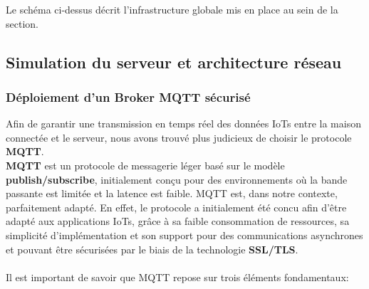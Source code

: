 \documentclass[10pt, a4paper]{report}
\begin{document}
	Le schéma ci-dessus décrit l'infrastructure globale mis en place au sein de la section.
	
	
 
	\subsection{Simulation du serveur et architecture réseau}
	\subsubsection{Déploiement d'un Broker MQTT sécurisé}
	
	Afin de garantir une transmission en temps réel des données IoTs entre la maison connectée et le serveur, nous avons trouvé plus judicieux de choisir le protocole \textbf{MQTT}.\\
	\textbf{MQTT} est un protocole de messagerie léger basé sur le modèle \textbf{publish/subscribe}, initialement conçu pour des environnements où la bande passante est limitée et la latence est faible. MQTT est, dans notre contexte, parfaitement adapté. En effet, le protocole a initialement été concu afin d'être adapté aux applications IoTs, grâce à sa faible consommation de ressources, sa simplicité d'implémentation et son support pour des communications asynchrones et pouvant être sécurisées par le biais de la technologie \textbf{SSL/TLS}.\\\\
	Il est important de savoir que MQTT repose sur trois éléments fondamentaux:
\end{document}

